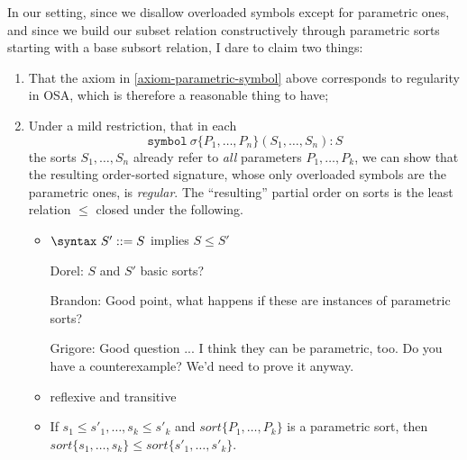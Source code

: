 \documentclass{article}
\newcommand\comment[2]{\par\noindent\color{red}#1: #2\color{black}\par\noindent}
\newcommand\dl{\comment{Dorel}}
\newcommand\gr{\comment{Grigore}}
\theoremstyle{definition}
\theoremstyle{definition}
\theoremstyle{definition}
\theoremstyle{definition}
\theoremstyle{theorem}
\theoremstyle{theorem}
\theoremstyle{theorem}
\theoremstyle{theorem}
\theoremstyle{theorem}
\newcommand{\Sort}[1]{\textit{sort}\{#1\}}
\newcommand{\KWsymbol}{\texttt{symbol}}
\begin{document}
In our setting, since we disallow overloaded
symbols except for parametric ones, and since we build
our subset relation constructively through
parametric sorts starting with a base subsort relation,
I dare to claim two things:
\begin{enumerate}[label={(\alph*)}]
\item That the axiom in \ref{axiom-parametric-symbol} above corresponds to
regularity in OSA, which is therefore a
reasonable thing to have;
\item Under a mild restriction, that in each
\[\KWsymbol\ \sigma\{P_1,\ldots,P_n\}(S_1,\ldots,S_n):S\]
the sorts \(S_1,\ldots,S_n\) already refer to \emph{all} parameters
\(P_1,\ldots,P_k\), we can show that the resulting order-sorted
signature, whose only overloaded symbols are the parametric ones, is
\emph{regular}.
The ``resulting'' partial order on sorts is the least relation \(\le\)
closed under the following.
\begin{itemize}
\item \(\syntax\ S'::=S\) implies \(S \le S'\)
\dl{$S$ and $S'$ basic sorts?}
\comment{Brandon}{Good point, what happens if these are instances of parametric sorts?}
\gr{Good question ... I think they can be parametric, too.  Do you have a counterexample?  We'd need to prove it anyway.}
\item reflexive and transitive
\item If \(s_1\le s'_1,\ldots,s_k\le s'_k\) and
\(\Sort{P_1,\ldots,P_k}\) is a parametric sort,
then \(\Sort{s_1,\ldots,s_k} \le \Sort{s'_1,\ldots,s'_k}\).
\end{itemize}
\end{enumerate}
\end{document}

